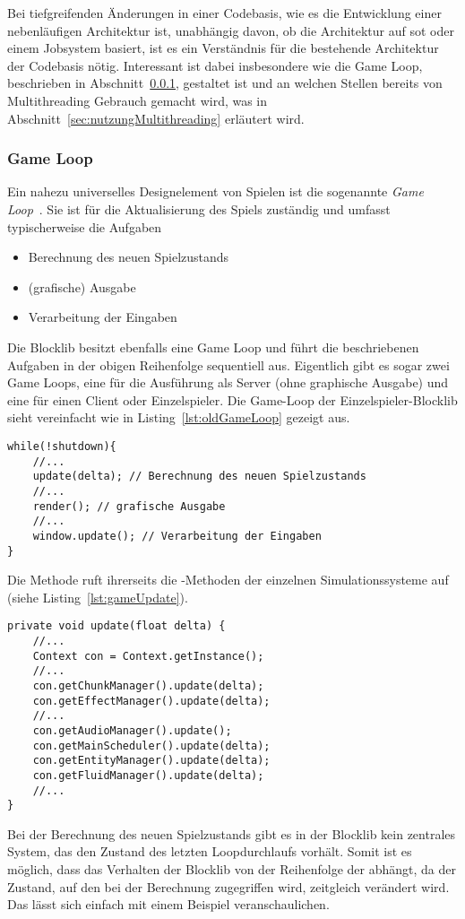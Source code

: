 Bei tiefgreifenden Änderungen in einer Codebasis, wie es die Entwicklung einer nebenläufigen Architektur ist, unabhängig davon, ob die Architektur auf \ac{sot} oder einem Jobsystem basiert, ist es ein Verständnis für die bestehende Architektur der Codebasis nötig. Interessant ist dabei insbesondere wie die Game Loop, beschrieben in Abschnitt~\ref{sec:gameLoop}, gestaltet ist und an welchen Stellen bereits von Multithreading Gebrauch gemacht wird, was in Abschnitt~\ref{sec:nutzungMultithreading} erläutert wird.

\subsubsection{Game Loop}\label{sec:gameLoop}
Ein nahezu universelles Designelement von Spielen ist die sogenannte \emph{Game Loop}~\cite[S.~161~ff.]{Nystrom2015}. Sie ist für die Aktualisierung des Spiels zuständig und umfasst typischerweise die Aufgaben 
\begin{itemize}
  \item Berechnung des neuen Spielzustands
  \item (grafische) Ausgabe
  \item Verarbeitung der Eingaben
\end{itemize}
Die Blocklib besitzt ebenfalls eine Game Loop und führt die beschriebenen Aufgaben in der obigen Reihenfolge sequentiell aus. Eigentlich gibt es sogar zwei Game Loops, eine für die Ausführung als Server (ohne graphische Ausgabe) und eine für einen Client oder Einzelspieler. Die Game-Loop der Einzelspieler-Blocklib sieht vereinfacht wie in Listing~\ref{lst:oldGameLoop} gezeigt aus.
\begin{lstlisting}[caption={Vereinfachte Version der Blocklib für Einzelspieler.},label={lst:oldGameLoop},float]
while(!shutdown){
	//...
	update(delta); // Berechnung des neuen Spielzustands
	//...
	render(); // grafische Ausgabe
	//...
	window.update(); // Verarbeitung der Eingaben
}
\end{lstlisting}

Die Methode  ruft ihrerseits die -Methoden der einzelnen Simulationssysteme auf (siehe Listing~\ref{lst:gameUpdate}).
\begin{lstlisting}[caption={Vereinfachte Update-Methode von \class{Game}.}, label={lst:gameUpdate},float]
private void update(float delta) {
	//...
	Context con = Context.getInstance();
	//...
	con.getChunkManager().update(delta);
	con.getEffectManager().update(delta);
	//...
	con.getAudioManager().update();
	con.getMainScheduler().update(delta);
	con.getEntityManager().update(delta);
	con.getFluidManager().update(delta);
	//...
}
\end{lstlisting}
Bei der Berechnung des neuen Spielzustands gibt es in der Blocklib kein zentrales System, das den Zustand des letzten Loopdurchlaufs vorhält. Somit ist es möglich, dass das Verhalten der Blocklib von der Reihenfolge der  abhängt, da der Zustand, auf den bei der Berechnung zugegriffen wird, zeitgleich verändert wird. Das lässt sich einfach mit einem Beispiel veranschaulichen. 

